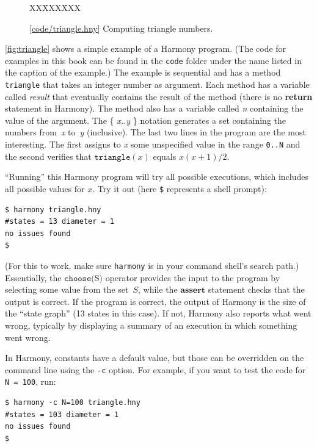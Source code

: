 \documentclass{report}
\newcommand{\harmonysource}[1]{
\begin{tabbing}
XX\=XXX\=XXX\kill
    
\end{tabbing}
}
\newcommand{\harmonylink}[1]{%
[\href{https://www.cs.cornell.edu/home/rvr/harmony/#1}{\underline{#1}}]%
}
\newenvironment{code}{
\tcolorbox
}{
\endtcolorbox
}
\begin{document}
\begin{figure}
\begin{code}
\harmonysource{triangle}
\end{code}
\caption{\harmonylink{code/triangle.hny} Computing triangle numbers.}
\label{fig:triangle}
\end{figure}

\autoref{fig:triangle} shows a simple example of a Harmony program.
(The code for examples in this book can be found in the \texttt{code} folder under
the name listed in the caption of the example.)
The example is sequential and has a method \texttt{triangle} that takes
an integer number as argument.  Each method has a variable called
\textit{result} that eventually contains the result of the
method (there is no \textbf{return} statement in Harmony).  The method
also has a variable called \textit{n} containing the value of the
argument.  The \{ \textit{x..y} \} notation generates a set containing the numbers
from~\textit{x} to~\textit{y} (inclusive).  The last two lines in the program are
the most interesting.
The first assigns to \textit{x} some unspecified value in the range \texttt{0..N}
and the second verifies that $\mathtt{triangle}(x)$ equals $x(x+1)/2$.

``Running'' this Harmony program will try all possible executions, which
includes all possible values for $x$.  Try it out (here \texttt{\$}
represents a shell prompt):

\begin{code}
\begin{verbatim}
$ harmony triangle.hny
#states = 13 diameter = 1
no issues found
$
\end{verbatim}
\end{code}

(For this to work, make sure \texttt{harmony} is in your command shell's search path.)
Essentially, the $\texttt{choose}($S$)$
%
operator provides the input to the program by selecting some value from the
set~$S$, while the $\textbf{assert}$ statement checks that the output is
correct.  If the program is correct, the output of Harmony is the size of the
``state graph'' (13 states in this case).  If not, Harmony also
reports what went wrong, typically by displaying a summary of an execution in
which something went wrong.

In Harmony, constants have a default value,
but those can be overridden on the command
line using the \texttt{-c} option.
%
For example, if you want to test the code for \texttt{N = 100}, run:
\begin{code}
\begin{verbatim}
$ harmony -c N=100 triangle.hny
#states = 103 diameter = 1
no issues found
$
\end{verbatim}
\end{code}
\end{document}

